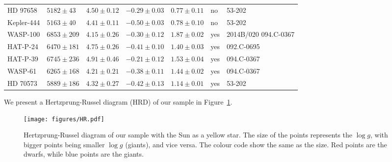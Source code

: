 \documentclass{aa}
\begin{document}
\begin{table*}[htb!]
\begin{tabular}{lllllll}
     HD 97658     &  $5182 \pm  43$      &  $4.50 \pm 0.12$    &  $-0.29 \pm 0.03$    &  $0.77 \pm 0.11$             &             no              &  53-202                                                                                                                  \\
   Kepler-444     &  $5163 \pm  40$      &  $4.41 \pm 0.11$    &  $-0.50 \pm 0.03$    &  $0.78 \pm 0.10$             &             no              &  53-202                                                                                                                  \\
     WASP-100     &  $6853 \pm 209$      &  $4.15 \pm 0.26$    &  $-0.30 \pm 0.12$    &  $1.87 \pm 0.02$             &             yes             &  2014B/020  094.C-0367                                                                                                   \\
     HAT-P-24     &  $6470 \pm 181$      &  $4.75 \pm 0.26$    &  $-0.41 \pm 0.10$    &  $1.40 \pm 0.03$             &             yes             &  092.C-0695                                                                                                              \\
     HAT-P-39     &  $6745 \pm 236$      &  $4.91 \pm 0.46$    &  $-0.21 \pm 0.12$    &  $1.53 \pm 0.04$             &             yes             &  094.C-0367                                                                                                              \\
      WASP-61     &  $6265 \pm 168$      &  $4.21 \pm 0.21$    &  $-0.38 \pm 0.11$    &  $1.44 \pm 0.02$             &             yes             &  094.C-0367                                                                                                              \\
     HD 70573     &  $5889 \pm 186$      &  $4.32 \pm 0.27$    &  $-0.42 \pm 0.13$    &  $1.14 \pm 0.01$             &             yes             &  53-202                                                                                                                  \\
      \hline
    \end{tabular}
\end{table*}
We present a Hertzprung-Russel diagram (HRD) of our sample in
Figure~\ref{fig:HRD}.
\begin{figure}[tpb]
    \centering
    \texttt{[image: figures/HR.pdf]}
    \caption{Hertzprung-Russel diagram of our sample with the Sun as a yellow
    star. The size of the points represents the $\log g$, with bigger points
    being smaller $\log g$ (giants), and vice versa. The colour code show the
    same as the size. Red points are the dwarfs, while blue points are the
    giants.}
    \label{fig:HRD}
\end{figure}
\end{document}
